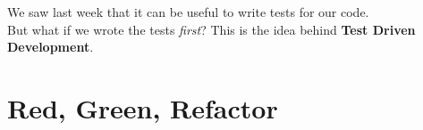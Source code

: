 We saw last week that it can be useful to write tests for our code.
\\

But what if we wrote the tests \textit{first}? This is the idea behind \textbf{Test Driven Development}.


\section{Red, Green, Refactor}
